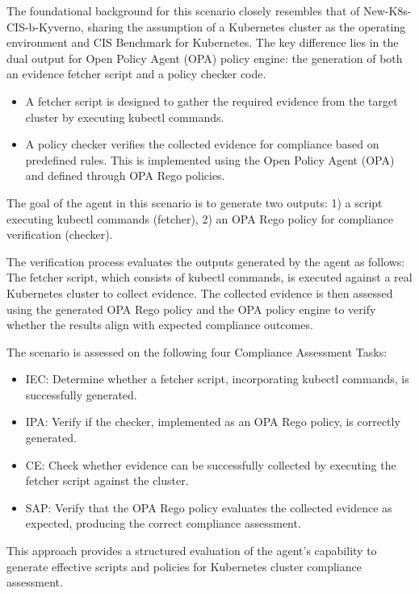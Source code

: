 The foundational background for this scenario closely resembles that of New-K8s-CIS-b-Kyverno, sharing the assumption of a Kubernetes cluster as the operating environment and CIS Benchmark for Kubernetes. The key difference lies in the dual output for Open Policy Agent (OPA) policy engine: the generation of both an evidence fetcher script and a policy checker code. 

\begin{itemize}
\item A fetcher script is designed to gather the required evidence from the target cluster by executing kubectl commands.
\item A policy checker  verifies the collected evidence for compliance based on predefined rules. This is implemented using the Open Policy Agent (OPA) and defined through OPA Rego policies.
\end{itemize}

The goal of the agent in this scenario is to generate two outputs: 1) a script executing kubectl commands (fetcher), 2) an OPA Rego policy for compliance verification (checker).

The verification process evaluates the outputs generated by the agent as follows: The fetcher script, which consists of kubectl commands, is executed against a real Kubernetes cluster to collect evidence. The collected evidence is then assessed using the generated OPA Rego policy and the OPA policy engine to verify whether the results align with expected compliance outcomes.

The scenario is assessed on the following four Compliance Assessment Tasks:
\begin{itemize}
\item IEC: Determine whether a fetcher script, incorporating kubectl commands, is successfully generated.
\item IPA: Verify if the checker, implemented as an OPA Rego policy, is correctly generated.
\item CE: Check whether evidence can be successfully collected by executing the fetcher script against the cluster.
\item SAP: Verify that the OPA Rego policy evaluates the collected evidence as expected, producing the correct compliance assessment.
\end{itemize}

This approach provides a structured evaluation of the agent's capability to generate effective scripts and policies for Kubernetes cluster compliance assessment.

